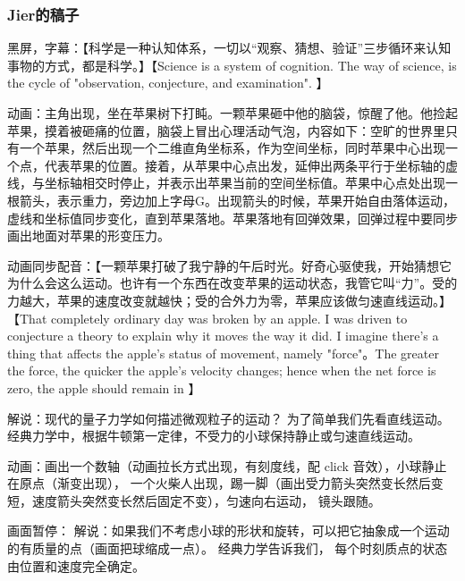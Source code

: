 
\begin{issues}
\issueDraft
\end{issues}


\subsubsection{Jier的稿子}



黑屏，字幕：【科学是一种认知体系，一切以“观察、猜想、验证”三步循环来认知事物的方式，都是科学。】【Science is a system of cognition. The way of science, is the cycle of "observation, conjecture, and examination". 】

动画：主角出现，坐在苹果树下打盹。一颗苹果砸中他的脑袋，惊醒了他。他捡起苹果，摸着被砸痛的位置，脑袋上冒出心理活动气泡，内容如下：空旷的世界里只有一个苹果，然后出现一个二维直角坐标系，作为空间坐标，同时苹果中心出现一个点，代表苹果的位置。接着，从苹果中心点出发，延伸出两条平行于坐标轴的虚线，与坐标轴相交时停止，并表示出苹果当前的空间坐标值。苹果中心点处出现一根箭头，表示重力，旁边加上字母G。出现箭头的时候，苹果开始自由落体运动，虚线和坐标值同步变化，直到苹果落地。苹果落地有回弹效果，回弹过程中要同步画出地面对苹果的形变压力。

动画同步配音：【一颗苹果打破了我宁静的午后时光。好奇心驱使我，开始猜想它为什么会这么运动。也许有一个东西在改变苹果的运动状态，我管它叫“力”。受的力越大，苹果的速度改变就越快；受的合外力为零，苹果应该做匀速直线运动。】【That completely ordinary day was broken by an apple. I was driven to conjecture a theory to explain why it moves the way it did. I imagine there's a thing that affects the apple's status of movement, namely "force"。The greater the force, the quicker the apple's velocity changes; hence when the net force is zero, the apple should remain in 】





解说：现代的量子力学如何描述微观粒子的运动？ 为了简单我们先看直线运动。 经典力学中，根据牛顿第一定律，不受力的小球保持静止或匀速直线运动。

动画：画出一个数轴（动画拉长方式出现，有刻度线，配 click 音效），小球静止在原点（渐变出现）， 一个火柴人出现，踢一脚（画出受力箭头突然变长然后变短，速度箭头突然变长然后固定不变），匀速向右运动， 镜头跟随。

画面暂停： 解说：如果我们不考虑小球的形状和旋转，可以把它抽象成一个运动的有质量的点（画面把球缩成一点）。 经典力学告诉我们， 每个时刻质点的状态由位置和速度完全确定。

